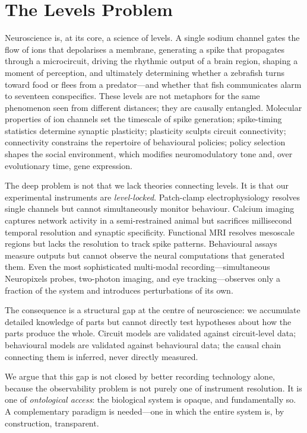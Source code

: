 \documentclass[12pt,a4paper]{article}
\begin{document}
\section*{The Levels Problem}

Neuroscience is, at its core, a science of levels.
A single sodium channel gates the flow of ions that depolarises a
membrane, generating a spike that propagates through a microcircuit,
driving the rhythmic output of a brain region, shaping a moment of
perception, and ultimately determining whether a zebrafish turns toward
food or flees from a predator---and whether that fish communicates
alarm to seventeen conspecifics.
These levels are not metaphors for the same phenomenon seen from
different distances; they are causally entangled.
Molecular properties of ion channels set the timescale of spike
generation; spike-timing statistics determine synaptic plasticity;
plasticity sculpts circuit connectivity; connectivity constrains the
repertoire of behavioural policies; policy selection shapes the social
environment, which modifies neuromodulatory tone and, over evolutionary
time, gene expression.

The deep problem is not that we lack theories connecting levels.
It is that our experimental instruments are \emph{level-locked}.
Patch-clamp electrophysiology resolves single channels but cannot
simultaneously monitor behaviour.
Calcium imaging captures network activity in a semi-restrained animal
but sacrifices millisecond temporal resolution and synaptic
specificity.
Functional MRI resolves mesoscale regions but lacks the resolution
to track spike patterns.
Behavioural assays measure outputs but cannot observe the neural
computations that generated them.
Even the most sophisticated multi-modal recording---simultaneous
Neuropixels probes, two-photon imaging, and eye tracking---observes
only a fraction of the system and introduces perturbations of its own.

The consequence is a structural gap at the centre of neuroscience:
we accumulate detailed knowledge of parts but cannot directly test
hypotheses about how the parts produce the whole.
Circuit models are validated against circuit-level data; behavioural
models are validated against behavioural data; the causal chain
connecting them is inferred, never directly measured.

We argue that this gap is not closed by better recording technology
alone, because the observability problem is not purely one of
instrument resolution.
It is one of \emph{ontological access}: the biological system is
opaque, and fundamentally so.
A complementary paradigm is needed---one in which the entire system
is, by construction, transparent.
\end{document}
